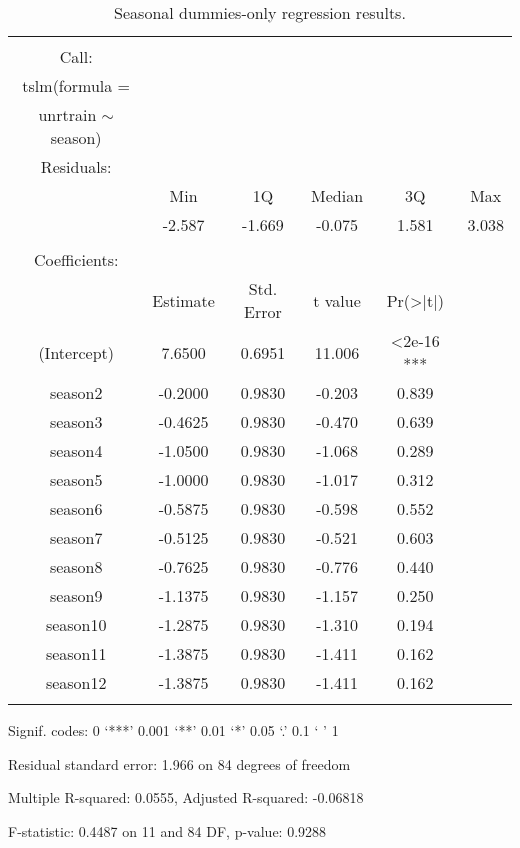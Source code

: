 \documentclass[12pt]{article}
\begin{document}
\begin{table}[!htbp] \centering 
\begin{threeparttable}
  \caption{Seasonal dummies-only regression results.} 
  \label{} 
\begin{tabular}{@{\extracolsep{5pt}} cccccc} 
 \toprule
\\[-1.8ex]\hline 
\hline \\[-1.8ex] 
Call: \\
tslm(formula = \\
unrtrain $\sim$ season) \\
\midrule
Residuals: \\
 &  Min  &    1Q & Median  &    3Q   &  Max \\
& -2.587 & -1.669 & -0.075 &  1.581 &  3.038 \\
\\
Coefficients: \\
     &        Estimate & Std. Error & t value & Pr(>|t|)    \\
(Intercept) &   7.6500   &   0.6951 &  11.006  &  <2e-16 *** \\
season2    &   -0.2000  &    0.9830 &  -0.203  &   0.839     \\
season3   &    -0.4625  &    0.9830  & -0.470  &   0.639    \\
season4    &   -1.0500   &   0.9830 & -1.068  &   0.289    \\
season5    &   -1.0000  &    0.9830 &  -1.017  &   0.312    \\
season6   &    -0.5875  &    0.9830 &  -0.598   &  0.552    \\
season7   &    -0.5125  &    0.9830 &  -0.521  &   0.603    \\
season8   &    -0.7625  &    0.9830 &  -0.776  &   0.440   \\ 
season9    &   -1.1375  &    0.9830  & -1.157  &   0.250    \\
season10   &   -1.2875  &    0.9830 &  -1.310   &  0.194    \\
season11    &  -1.3875  &    0.9830  & -1.411   &  0.162    \\
season12  &    -1.3875   &   0.9830 &   -1.411  &   0.162    \\
\hline \\[-1.8ex] 
\bottomrule
 \end{tabular}
 \begin{tablenotes}
      \small
      \item Signif. codes:  0 ‘***’ 0.001 ‘**’ 0.01 ‘*’ 0.05 ‘.’ 0.1 ‘ ’ 1
\item Residual standard error: 1.966 on 84 degrees of freedom
\item Multiple R-squared:  0.0555,	Adjusted R-squared:  -0.06818 
\item F-statistic: 0.4487 on 11 and 84 DF,  p-value: 0.9288
\end{tablenotes}
  \end{threeparttable}
\end{table} 
\end{document}
